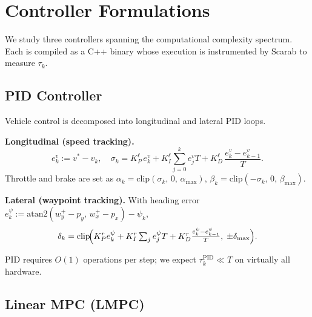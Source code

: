 \documentclass[conference]{IEEEtran}
\begin{document}
\section{Controller Formulations}\label{sec:controllers}

We study three controllers spanning the computational complexity
spectrum.  Each is compiled as a C++ binary whose execution is
instrumented by Scarab to measure $\tau_k$.

\subsection{PID Controller}\label{sec:pid}

Vehicle control is decomposed into longitudinal and lateral PID loops.

\noindent\textbf{Longitudinal (speed tracking).}
\begin{equation}\label{eq:pid_lon}
  e_k^v := v^* - v_k, \quad
  \sigma_k = K_P^\ell\, e_k^v +
  K_I^\ell \!\sum_{j=0}^{k} e_j^v T +
  K_D^\ell\, \frac{e_k^v - e_{k-1}^v}{T}.
\end{equation}
Throttle and brake are set as
$\alpha_k = \mathrm{clip}(\sigma_k,\, 0,\, \alpha_\text{max})$,
$\beta_k = \mathrm{clip}(-\sigma_k,\, 0,\, \beta_\text{max})$.

\noindent\textbf{Lateral (waypoint tracking).}
With heading error
$e_k^\psi := \mathrm{atan2}(w_y^+ - p_y,\, w_x^+ - p_x) - \psi_k$,
\begin{equation}\label{eq:pid_lat}
  \delta_k = \mathrm{clip}\!\Bigl(K_P^r e_k^\psi + K_I^r
  \textstyle\sum_{j} e_j^\psi T + K_D^r
  \frac{e_k^\psi - e_{k-1}^\psi}{T},\;
  \pm\delta_\text{max}\Bigr).
\end{equation}

PID requires $O(1)$ operations per step; we expect
$\tau_k^{\mathrm{PID}} \ll T$ on virtually all hardware.

\subsection{Linear MPC (LMPC)}\label{sec:lmpc}
\end{document}
